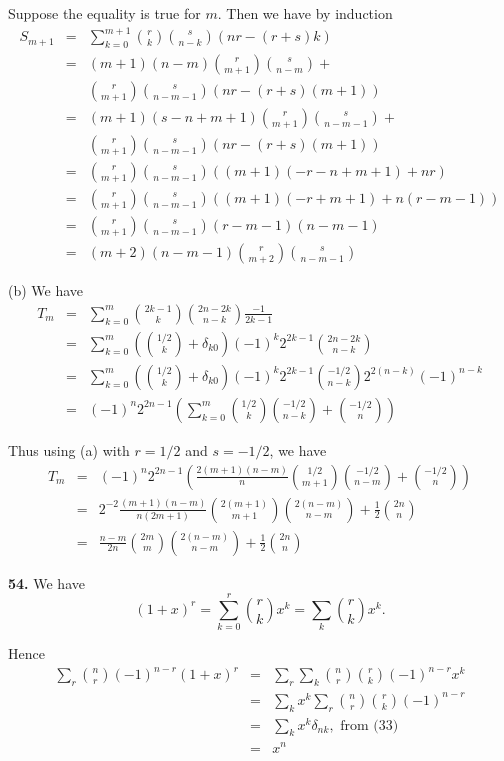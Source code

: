 \documentclass[a4paper,12pt]{article}
\newcommand{\newpar}[1]{\bigskip \noindent \textbf{#1.}}
\newcommand{\subpar}[1]{\medskip \noindent (#1)}
\begin{document}
Suppose the equality is true for $m$.  Then we have by induction
\begin{eqnarray*}
 S_{m+1} &=&  \sum_{k=0}^{m+1} {r \choose k}{s \choose n-k} (nr -
 (r+s)k) \\
 &=& (m+1)(n-m){r\choose m+1}{s \choose n-m} + \\ && {r \choose m+1}{s \choose
   n -m -1}(nr-(r+s)(m+1)) \\
 &=& (m+1)(s-n+m+1) {r \choose m+1}{s \choose n-m-1} + \\
 && {r \choose m+1}{s \choose n-m-1}(nr-(r+s)(m+1)) \\
 &=& {r \choose m+1}{s \choose n-m-1} ((m+1)(-r -n + m + 1) + nr) \\
 &=& {r \choose m+1}{s \choose n-m-1}((m+1)(-r+m+1) + n(r-m-1)) \\
 &=& {r \choose m+1}{s \choose n-m-1}(r-m-1)(n-m-1) \\
 &=& (m+2)(n-m-1) {r \choose m+2} {s \choose n-m-1}
\end{eqnarray*}

\subpar{b} We have
\begin{eqnarray*}
  T_m &=& \sum_{k=0}^m {2k-1\choose k}{2n-2k\choose n-k}
  \frac{-1}{2k-1} \\
  &=& \sum_{k=0}^m \left( {1/2 \choose k} + \delta_{k0}
  \right)(-1)^k2^{2k-1} {2n - 2k \choose n-k} \\
  &=& \sum_{k=0}^m \left( {1/2 \choose k} + \delta_{k0}\right) (-1)^k
  2^{2k-1} {-1/2 \choose n-k} 2^{2(n-k)}(-1)^{n-k} \\
  &=& (-1)^n 2^{2n-1} \left( \sum_{k=0}^m {1/2 \choose k}{-1/2 \choose
    n-k} + {-1/2 \choose n} \right)
\end{eqnarray*}

Thus using (a) with $r=1/2$ and $s=-1/2$, we have
\begin{eqnarray*}
  T_m &=& (-1)^n2^{2n-1}\left( \frac{2(m+1)(n-m)}{n}{1/2 \choose m+1}{-1/2
    \choose n-m} + {-1/2 \choose n}\right) \\
  &=& 2^{-2} \frac{(m+1)(n-m)}{n(2m+1)} {2(m+1)
    \choose m+1} {2(n-m) \choose n-m} + \frac{1}{2} {2n \choose n} \\
  &=& \frac{n-m}{2n} {2m \choose m}{2(n-m) \choose n-m} + \frac{1}{2}
  {2n \choose n}
\end{eqnarray*}

\newpar{54}  We have
\[ (1+x)^r = \sum_{k=0}^r {r \choose k} x^k = \sum_k {r \choose k}
x^k.\]

Hence
\begin{eqnarray*}
  \sum_r {n \choose r} (-1)^{n-r}(1+x)^r &=& \sum_r \sum_k {n \choose
    r}{r \choose k} (-1)^{n-r} x^k \\
  &=& \sum_k x^k \sum_r {n \choose r}{r \choose k}(-1)^{n-r} \\
  &=& \sum_k x^k \delta_{nk}, \mbox{ from (33)} \\
  &=& x^n
\end{eqnarray*}
\end{document}
